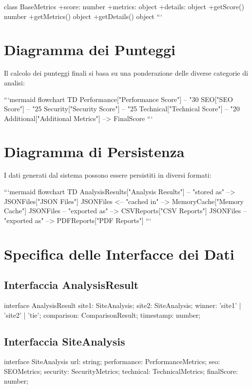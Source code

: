 {{{{{{{    class BaseMetrics {
        +score: number
        +metrics: object
        +details: object
        +getScore() number
        +getMetrics() object
        +getDetails() object
    }
```

\section{Diagramma dei Punteggi}
Il calcolo dei punteggi finali si basa su una ponderazione delle diverse categorie di analisi:

```mermaid
flowchart TD
    Performance["Performance Score"] -- "30%
    SEO["SEO Score"] -- "25%
    Security["Security Score"] -- "25%
    Technical["Technical Score"] -- "20%
    Additional["Additional Metrics"] --> FinalScore
```

\section{Diagramma di Persistenza}
I dati generati dal sistema possono essere persistiti in diversi formati:

```mermaid
flowchart TD
    AnalysisResults["Analysis Results"] -- "stored as" --> JSONFiles["JSON Files"]
    JSONFiles <-- "cached in" --> MemoryCache["Memory Cache"]
    JSONFiles -- "exported as" --> CSVReports["CSV Reports"]
    JSONFiles -- "exported as" --> PDFReports["PDF Reports"]
```

\section{Specifica delle Interfacce dei Dati}

\subsection{Interfaccia AnalysisResult}
\begin{asciiart}
interface AnalysisResult {
  site1: SiteAnalysis;
  site2: SiteAnalysis;
  winner: 'site1' | 'site2' | 'tie';
  comparison: ComparisonResult;
  timestamp: number;
}
\end{asciiart}

\subsection{Interfaccia SiteAnalysis}
\begin{asciiart}
interface SiteAnalysis {
  url: string;
  performance: PerformanceMetrics;
  seo: SEOMetrics;
  security: SecurityMetrics;
  technical: TechnicalMetrics;
  finalScore: number;
}
\end{asciiart}

}}}}}}}
